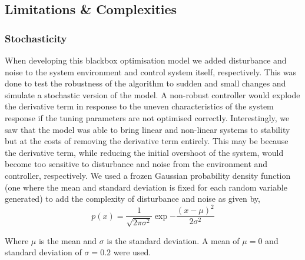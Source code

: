 \documentclass[conference]{IEEEtran}
\theoremstyle{definition}
\begin{document}
\subsection{Limitations \& Complexities}
\subsubsection{Stochasticity}
When developing this blackbox optimisation model we added disturbance and noise to the system environment and control system itself, respectively. This was done to test the robustness of the algorithm to sudden and small changes and simulate a stochastic version of the model. A non-robust controller would explode the derivative term in response to the uneven characteristics of the system response if the tuning parameters are not optimised correctly. Interestingly, we saw that the model was able to bring linear and non-linear systems to stability but at the costs of removing the derivative term entirely. This may be because the derivative term, while reducing the initial overshoot of the system, would become too sensitive to disturbance and noise from the environment and controller, respectively. We used a frozen Gaussian probability density function (one where the mean and standard deviation is fixed for each random variable generated) to add the complexity of disturbance and noise as given by,
\begin{equation}
    p(x) = \frac{1}{\sqrt{2\pi \sigma^2}} \exp{-\frac{(x-\mu)^2}{2\sigma^2}}
\end{equation}

\noindent Where $\mu$ is the mean and $\sigma$ is the standard deviation. A mean of $\mu = 0$ and standard deviation of $\sigma = 0.2$ were used. 
\end{document}
